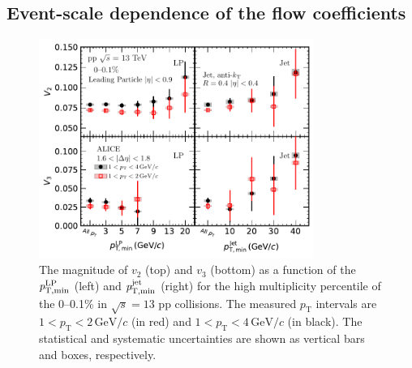 \subsection{Event-scale dependence of the flow coefficients}
\begin{figure}[h!]
	\centering
	\hspace{-3em}\includegraphics[width=0.8\textwidth]{figures/Fig4_vn_LP.pdf}
	\caption{The magnitude of $v_2$ (top) and $v_3$ (bottom) as a function of the $\it{p}^{\rm{LP}}_{\rm{T,min}}$ (left) and $\it{p}^{\rm{jet}}_{\rm{T,min}}$ (right) for the high multiplicity percentile of the 0--0.1\% in $\sqrt{s}=13$ pp collisions. The measured $p_{\mathrm{T}}$ intervals are $1<p_{\mathrm{T}}<2\,\mathrm{GeV}/c$ (in red) and $1<p_{\mathrm{T}}<4\,\mathrm{GeV}/c$ (in black). The statistical and systematic uncertainties are shown as vertical bars and boxes, respectively.}
	\label{fig:LPjet23}
\end{figure}    


